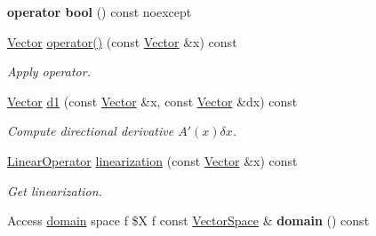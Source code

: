 \begin{DoxyCompactItemize}
\item 
\hypertarget{classSpacy_1_1C1Operator_a4efdf099aac5f0b101c69cc8c9c8a48b}{{\bfseries operator bool} () const noexcept}\label{classSpacy_1_1C1Operator_a4efdf099aac5f0b101c69cc8c9c8a48b}

\item 
\hypertarget{classSpacy_1_1C1Operator_a2a01bf08bf2b6e44955cd606aa3db91d}{\hyperlink{classSpacy_1_1Vector}{\-Vector} \hyperlink{classSpacy_1_1C1Operator_a2a01bf08bf2b6e44955cd606aa3db91d}{operator()} (const \hyperlink{classSpacy_1_1Vector}{\-Vector} \&x) const }\label{classSpacy_1_1C1Operator_a2a01bf08bf2b6e44955cd606aa3db91d}

\begin{DoxyCompactList}\small\item\em \-Apply operator. \end{DoxyCompactList}\item 
\hypertarget{classSpacy_1_1C1Operator_a1b6a06c88bc4168c750ee4ffdc81f1dd}{\hyperlink{classSpacy_1_1Vector}{\-Vector} \hyperlink{classSpacy_1_1C1Operator_a1b6a06c88bc4168c750ee4ffdc81f1dd}{d1} (const \hyperlink{classSpacy_1_1Vector}{\-Vector} \&x, const \hyperlink{classSpacy_1_1Vector}{\-Vector} \&dx) const }\label{classSpacy_1_1C1Operator_a1b6a06c88bc4168c750ee4ffdc81f1dd}

\begin{DoxyCompactList}\small\item\em \-Compute directional derivative $A'(x)\delta x$. \end{DoxyCompactList}\item 
\hypertarget{classSpacy_1_1C1Operator_a71aabe09ec29a8a1bb197eef035d6672}{\hyperlink{classSpacy_1_1LinearOperator}{\-Linear\-Operator} \hyperlink{classSpacy_1_1C1Operator_a71aabe09ec29a8a1bb197eef035d6672}{linearization} (const \hyperlink{classSpacy_1_1Vector}{\-Vector} \&x) const }\label{classSpacy_1_1C1Operator_a71aabe09ec29a8a1bb197eef035d6672}

\begin{DoxyCompactList}\small\item\em \-Get linearization. \end{DoxyCompactList}\item 
\hypertarget{classSpacy_1_1C1Operator_a0ce49bb91eee9fa9cc5d63599ab9b23c}{\-Access \hyperlink{classSpacy_1_1C1Operator_aee0ffd5cee0b8a8df2f0b67b5aaf0ddb}{domain} space f \$\-X f \*
const \hyperlink{classSpacy_1_1VectorSpace}{\-Vector\-Space} \& {\bfseries domain} () const }\label{classSpacy_1_1C1Operator_a0ce49bb91eee9fa9cc5d63599ab9b23c}


\end{DoxyCompactItemize}
